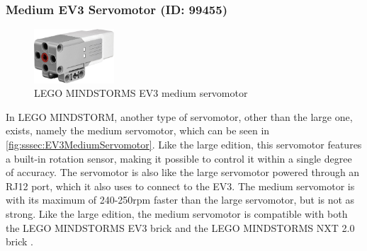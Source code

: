 \subsubsection{Medium EV3 Servomotor (ID: 99455)}
\begin{figure}[H]
  \centering
  \includegraphics[width=3cm]{images/techAnalysis/LegoEV3MediumServomotor.jpg}
  \caption{LEGO MINDSTORMS EV3 medium servomotor \cite{BrickOWl-figure-EV3-mediumServo}}\label{fig:sssec:EV3MediumServomotor}
\end{figure}
In LEGO MINDSTORM, another type of servomotor, other than the large one, exists, namely the medium servomotor, which can be seen in \autoref{fig:sssec:EV3MediumServomotor}.
Like the large edition, this servomotor features a built-in rotation sensor, making it possible to control it within a single degree of accuracy.
The servomotor is also like the large servomotor powered through an RJ12 port, which it also uses to connect to the EV3.
The medium servomotor is with its maximum of 240-250rpm faster than the large servomotor, but is not as strong.
Like the large edition, the medium servomotor is compatible with both the LEGO MINDSTORMS EV3 brick and the LEGO MINDSTORMS NXT 2.0 brick \cite{lego_lego_EV3NXTCompatibility}.
\cite{LEGO_mindstorms_2013-1}
